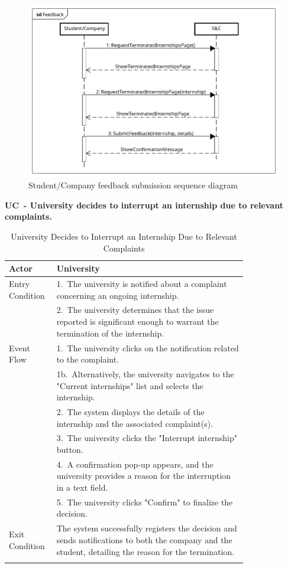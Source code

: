 \begin{figure}[H]
    \centering
    \includegraphics[width=1\linewidth]{Images/Sequence diagrams/Feedback.png}
    \caption{Student/Company feedback submission sequence diagram}
    \label{fig:enter-label}
\end{figure}

\textbf{UC\cuc\  - University decides to interrupt an internship due to relevant complaints.}

\begin{center} 
    \renewcommand{\arraystretch}{1.2} 
    \begin{longtable}{ l p{0.8\linewidth} } 
        \hline 
        Actor & University \\ \hline 
        Entry Condition & 1.\ The university is notified about a complaint concerning an ongoing internship. \\ 
        & 2.\ The university determines that the issue reported is significant enough to warrant the termination of the internship. \\ \hline
        Event Flow &  1.\ The university clicks on the notification related to the complaint. \\ 
        & 1b.\ Alternatively, the university navigates to the "Current internships" list and selects the internship. \\ 
        & 2.\ The system displays the details of the internship and the associated complaint(s). \\ 
        & 3.\ The university clicks the "Interrupt internship" button. \\ 
        & 4.\ A confirmation pop-up appears, and the university provides a reason for the interruption in a text field. \\ 
        & 5.\ The university clicks "Confirm" to finalize the decision. \\ \hline 
        Exit Condition & The system successfully registers the decision and sends notifications to both the company and the student, detailing the reason for the termination. \\ \hline
        \caption{University Decides to Interrupt an Internship Due to Relevant Complaints} 
        \label{tab:university_interrupt_uc} 
    \end{longtable} 
\end{center}

